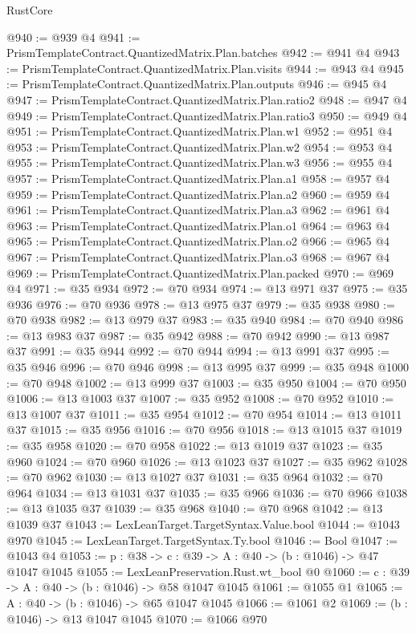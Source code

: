 \begin{lexlean}{RustCore}
\begin{coremodule}
@940 := @939 @4
@941 := PrismTemplateContract.QuantizedMatrix.Plan.batches
@942 := @941 @4
@943 := PrismTemplateContract.QuantizedMatrix.Plan.visits
@944 := @943 @4
@945 := PrismTemplateContract.QuantizedMatrix.Plan.outputs
@946 := @945 @4
@947 := PrismTemplateContract.QuantizedMatrix.Plan.ratio2
@948 := @947 @4
@949 := PrismTemplateContract.QuantizedMatrix.Plan.ratio3
@950 := @949 @4
@951 := PrismTemplateContract.QuantizedMatrix.Plan.w1
@952 := @951 @4
@953 := PrismTemplateContract.QuantizedMatrix.Plan.w2
@954 := @953 @4
@955 := PrismTemplateContract.QuantizedMatrix.Plan.w3
@956 := @955 @4
@957 := PrismTemplateContract.QuantizedMatrix.Plan.a1
@958 := @957 @4
@959 := PrismTemplateContract.QuantizedMatrix.Plan.a2
@960 := @959 @4
@961 := PrismTemplateContract.QuantizedMatrix.Plan.a3
@962 := @961 @4
@963 := PrismTemplateContract.QuantizedMatrix.Plan.o1
@964 := @963 @4
@965 := PrismTemplateContract.QuantizedMatrix.Plan.o2
@966 := @965 @4
@967 := PrismTemplateContract.QuantizedMatrix.Plan.o3
@968 := @967 @4
@969 := PrismTemplateContract.QuantizedMatrix.Plan.packed
@970 := @969 @4
@971 := @35 @934
@972 := @70 @934
@974 := @13 @971 @37
@975 := @35 @936
@976 := @70 @936
@978 := @13 @975 @37
@979 := @35 @938
@980 := @70 @938
@982 := @13 @979 @37
@983 := @35 @940
@984 := @70 @940
@986 := @13 @983 @37
@987 := @35 @942
@988 := @70 @942
@990 := @13 @987 @37
@991 := @35 @944
@992 := @70 @944
@994 := @13 @991 @37
@995 := @35 @946
@996 := @70 @946
@998 := @13 @995 @37
@999 := @35 @948
@1000 := @70 @948
@1002 := @13 @999 @37
@1003 := @35 @950
@1004 := @70 @950
@1006 := @13 @1003 @37
@1007 := @35 @952
@1008 := @70 @952
@1010 := @13 @1007 @37
@1011 := @35 @954
@1012 := @70 @954
@1014 := @13 @1011 @37
@1015 := @35 @956
@1016 := @70 @956
@1018 := @13 @1015 @37
@1019 := @35 @958
@1020 := @70 @958
@1022 := @13 @1019 @37
@1023 := @35 @960
@1024 := @70 @960
@1026 := @13 @1023 @37
@1027 := @35 @962
@1028 := @70 @962
@1030 := @13 @1027 @37
@1031 := @35 @964
@1032 := @70 @964
@1034 := @13 @1031 @37
@1035 := @35 @966
@1036 := @70 @966
@1038 := @13 @1035 @37
@1039 := @35 @968
@1040 := @70 @968
@1042 := @13 @1039 @37
@1043 := LexLeanTarget.TargetSyntax.Value.bool
@1044 := @1043 @970
@1045 := LexLeanTarget.TargetSyntax.Ty.bool
@1046 := Bool
@1047 := @1043 @4
@1053 := {p : @38} -> {c : @39} -> {A : @40} -> (b : @1046) -> @47 @1047 @1045
@1055 := LexLeanPreservation.Rust.wt_bool @0
@1060 := {c : @39} -> {A : @40} -> (b : @1046) -> @58 @1047 @1045
@1061 := @1055 @1
@1065 := {A : @40} -> (b : @1046) -> @65 @1047 @1045
@1066 := @1061 @2
@1069 := (b : @1046) -> @13 @1047 @1045
@1070 := @1066 @970

\end{coremodule}
\end{lexlean}
